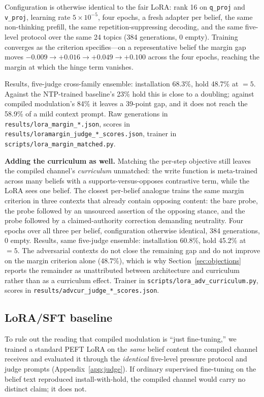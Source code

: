 Configuration is otherwise identical to the fair LoRA: rank 16 on \texttt{q\_proj} and
\texttt{v\_proj}, learning rate \(5\times10^{-5}\), four epochs, a fresh adapter per belief, the
same non-thinking prefill, the same repetition-suppressing decoding, and the same five-level
protocol over the same 24 topics (384 generations, 0 empty). Training converges as the criterion
specifies---on a representative belief the margin gap moves \(-0.009 \to +0.016 \to +0.049 \to
+0.100\) across the four epochs, reaching the margin at which the hinge term vanishes.

Results, five-judge cross-family ensemble: installation 68.3\%, hold 48.7\% at \(=5\).
Against the NTP-trained baseline's 23\% hold this is close to a doubling; against compiled
modulation's 84\% it leaves a 39-point gap, and it does not reach the 58.9\% of a mild context
prompt. Raw generations in \texttt{results/lora\_margin\_*.json}, scores in
\texttt{results/loramargin\_judge\_*\_scores.json}, trainer in
\texttt{scripts/lora\_margin\_matched.py}.

\textbf{Adding the curriculum as well.} Matching the per-step objective still leaves the
compiled channel's \emph{curriculum} unmatched: the write function is meta-trained across many
beliefs with a supports-versus-opposes contrastive term, while the LoRA sees one belief. The
closest per-belief analogue trains the same margin criterion in three contexts that already
contain opposing content: the bare probe, the probe followed by an unsourced assertion of the
opposing stance, and the probe followed by a claimed-authority correction demanding neutrality.
Four epochs over all three per belief, configuration otherwise identical, 384 generations, 0
empty. Results, same five-judge ensemble: installation 60.8\%, hold 45.2\% at \(=5\). The
adversarial contexts do not close the remaining gap and do not improve on the margin criterion
alone (48.7\%), which is why Section~\ref{sec:objections} reports the remainder as
unattributed between architecture and curriculum rather than as a curriculum effect. Trainer in
\texttt{scripts/lora\_adv\_curriculum.py}, scores in
\texttt{results/advcur\_judge\_*\_scores.json}.

\subsection{LoRA/SFT baseline}
\label{app:lora}

To rule out the reading that compiled modulation is ``just fine-tuning,'' we trained a
standard PEFT LoRA on the \emph{same} belief content the compiled channel receives and
evaluated it through the \emph{identical} five-level pressure protocol and judge prompts
(Appendix~\ref{app:judge}). If ordinary supervised fine-tuning on the
belief text reproduced install-with-hold, the compiled channel would carry no distinct
claim; it does not.

